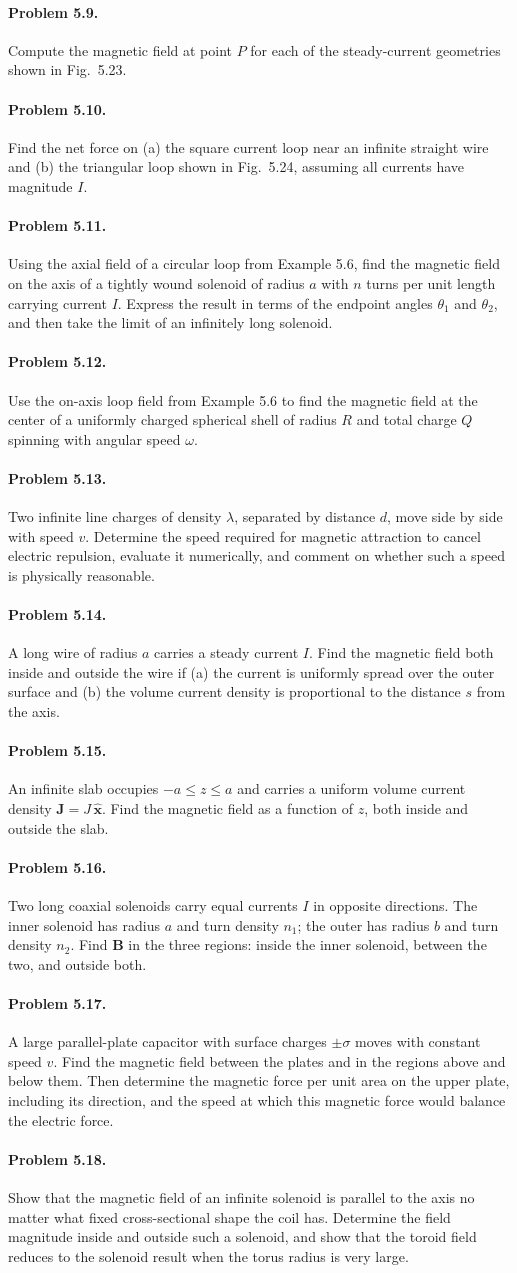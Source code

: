 \documentclass{aa}
\newcommand{\problemstatement}[2]{%
\paragraph{Problem #1.}#2\par\medskip
}
\begin{document}
\problemstatement{5.9}{Compute the magnetic field at point \(P\) for each of the steady-current geometries shown in Fig.~5.23.}
\problemstatement{5.10}{Find the net force on (a) the square current loop near an infinite straight wire and (b) the triangular loop shown in Fig.~5.24, assuming all currents have magnitude \(I\).}
\problemstatement{5.11}{Using the axial field of a circular loop from Example 5.6, find the magnetic field on the axis of a tightly wound solenoid of radius \(a\) with \(n\) turns per unit length carrying current \(I\). Express the result in terms of the endpoint angles \(\theta_1\) and \(\theta_2\), and then take the limit of an infinitely long solenoid.}
\problemstatement{5.12}{Use the on-axis loop field from Example 5.6 to find the magnetic field at the center of a uniformly charged spherical shell of radius \(R\) and total charge \(Q\) spinning with angular speed \(\omega\).}
\problemstatement{5.13}{Two infinite line charges of density \(\lambda\), separated by distance \(d\), move side by side with speed \(v\). Determine the speed required for magnetic attraction to cancel electric repulsion, evaluate it numerically, and comment on whether such a speed is physically reasonable.}
\problemstatement{5.14}{A long wire of radius \(a\) carries a steady current \(I\). Find the magnetic field both inside and outside the wire if (a) the current is uniformly spread over the outer surface and (b) the volume current density is proportional to the distance \(s\) from the axis.}
\problemstatement{5.15}{An infinite slab occupies \(-a \le z \le a\) and carries a uniform volume current density \(\mathbf J = J\,\hat{\mathbf x}\). Find the magnetic field as a function of \(z\), both inside and outside the slab.}
\problemstatement{5.16}{Two long coaxial solenoids carry equal currents \(I\) in opposite directions. The inner solenoid has radius \(a\) and turn density \(n_1\); the outer has radius \(b\) and turn density \(n_2\). Find \(\mathbf B\) in the three regions: inside the inner solenoid, between the two, and outside both.}
\problemstatement{5.17}{A large parallel-plate capacitor with surface charges \(\pm \sigma\) moves with constant speed \(v\). Find the magnetic field between the plates and in the regions above and below them. Then determine the magnetic force per unit area on the upper plate, including its direction, and the speed at which this magnetic force would balance the electric force.}
\problemstatement{5.18}{Show that the magnetic field of an infinite solenoid is parallel to the axis no matter what fixed cross-sectional shape the coil has. Determine the field magnitude inside and outside such a solenoid, and show that the toroid field reduces to the solenoid result when the torus radius is very large.}
\end{document}
